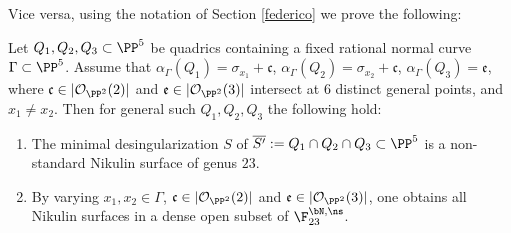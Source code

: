 \Changelback

Vice versa, using the notation of Section \ref{federico} we prove the following:

\begin{prop}\label{ita}
Let $Q_1,Q_2,Q_3\subset \PP^5$ be quadrics containing a fixed rational normal curve $\Gamma\subset\PP^5$. Assume that $\alpha_\Gamma(Q_1)=\sigma_{x_1}+\mathfrak{c}$, $\alpha_\Gamma(Q_2)=\sigma_{x_2}+\mathfrak{c}$, $\alpha_\Gamma(Q_3)=\mathfrak{e}$, where $\mathfrak{c}\in |\mathcal O_{\PP^2}(2)|$ and $\mathfrak{e}\in |\mathcal O_{\PP^2}(3)|$ intersect at $6$ distinct general points, and $x_1\neq x_2$. Then for general such $Q_1,Q_2,Q_3$ the following hold:
\begin{enumerate}
\item\label{itai} The minimal desingularization $S$ of $\overline{S'}:= Q_1\cap Q_2\cap Q_3\subset \PP^5$ is a non-standard Nikulin surface of genus $23$.
\item\label{itaii} By varying $x_1,x_2\in \Gamma$, $\mathfrak{c}\in |\mathcal O_{\PP^2}(2)|$ and $\mathfrak{e}\in |\mathcal O_{\PP^2}(3)|$, one obtains all Nikulin surfaces in a dense open subset of $\F_{23}^{\bN,\ns}$.
\end{enumerate}
\end{prop}

